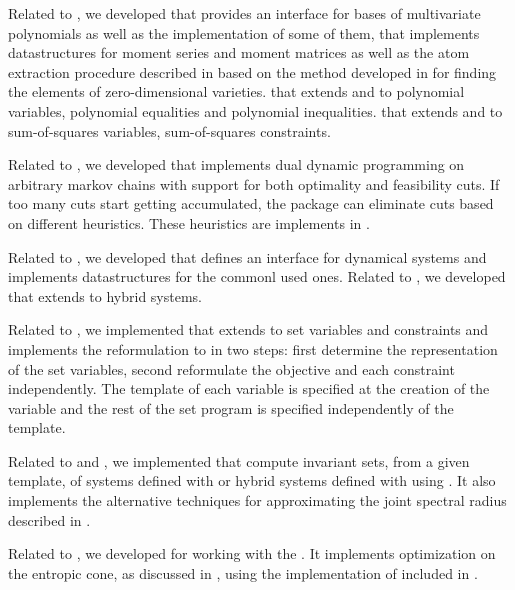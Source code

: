 Related to , we developed
 that provides an interface for bases of multivariate polynomials as well as the implementation of some of them,
 that implements datastructures for moment series and moment matrices as well as the atom extraction procedure described in  based on the method developed in  for finding the elements of zero-dimensional varieties.
 that extends  and  to polynomial variables, polynomial equalities and polynomial inequalities.
 that extends  and  to sum-of-squares variables, sum-of-squares constraints.

Related to , we developed  that implements dual dynamic programming on arbitrary markov chains with support for both optimality and feasibility cuts. If too many cuts start getting accumulated, the package can eliminate cuts based on different heuristics. These heuristics are implements in .

Related to , we developed  that defines an interface
for dynamical systems and implements datastructures for the commonl used ones.
Related to , we developed  that extends  to hybrid systems.

Related to , we implemented  that extends 
to set variables and constraints and implements the reformulation to 
in two steps: first determine the representation of the set variables, second reformulate the objective and each constraint independently.
The template of each variable is specified at the creation of the variable and the rest
of the set program is specified independently of the template.

Related to  and , we implemented 
that compute invariant sets, from a given template, of systems defined with  or hybrid systems defined with 
using .
It also implements the alternative techniques for approximating the joint spectral radius
described in .

Related to ,
we developed  for working with the \tEc{}.
It implements optimization on the entropic cone, as discussed in ,
using the implementation of  included in .

